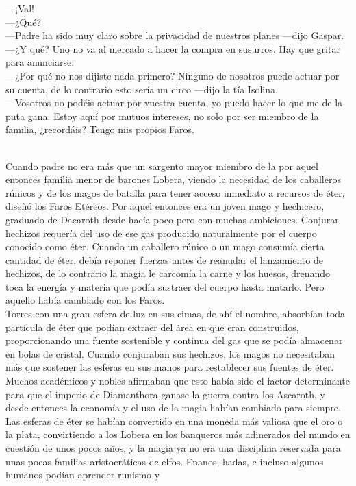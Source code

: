 \documentclass[
  letterpaper,
]{book}
\begin{document}
---¡Val!\\
---¿Qué?\\
---Padre ha sido muy claro sobre la privacidad de nuestros planes
---dijo Gaspar.\\
---¿Y qué? Uno no va al mercado a hacer la compra en susurros. Hay que
gritar para anunciarse.\\
---¿Por qué no nos dijiste nada primero? Ninguno de nosotros puede
actuar por su cuenta, de lo contrario esto sería un circo ---dijo la tía
Isolina.\\
---Vosotros no podéis actuar por vuestra cuenta, yo puedo hacer lo que
me de la puta gana. Estoy aquí por mutuos intereses, no solo por ser
miembro de la familia, ¿recordáis? Tengo mis propios Faros.\\
\strut \\
Cuando padre no era más que un sargento mayor miembro de la por aquel
entonces familia menor de barones Lobera, viendo la necesidad de los
caballeros rúnicos y de los magos de batalla para tener acceso inmediato
a recursos de éter, diseñó los Faros Etéreos. Por aquel entonces era un
joven mago y hechicero, graduado de Dacaroth desde hacía poco pero con
muchas ambiciones. Conjurar hechizos requería del uso de ese gas
producido naturalmente por el cuerpo conocido como éter. Cuando un
caballero rúnico o un mago consumía cierta cantidad de éter, debía
reponer fuerzas antes de reanudar el lanzamiento de hechizos, de lo
contrario la magia le carcomía la carne y los huesos, drenando toca la
energía y materia que podía sustraer del cuerpo hasta matarlo. Pero
aquello había cambiado con los Faros.\\
Torres con una gran esfera de luz en sus cimas, de ahí el nombre,
absorbían toda partícula de éter que podían extraer del área en que eran
construidos, proporcionando una fuente sostenible y continua del gas que
se podía almacenar en bolas de cristal. Cuando conjuraban sus hechizos,
los magos no necesitaban más que sostener las esferas en sus manos para
restablecer sus fuentes de éter. Muchos académicos y nobles afirmaban
que esto había sido el factor determinante para que el imperio de
Diamanthora ganase la guerra contra los Ascaroth, y desde entonces la
economía y el uso de la magia habían cambiado para siempre. Las esferas
de éter se habían convertido en una moneda más valiosa que el oro o la
plata, convirtiendo a los Lobera en los banqueros más adinerados del
mundo en cuestión de unos pocos años, y la magia ya no era una
disciplina reservada para unas pocas familias aristocráticas de elfos.
Enanos, hadas, e incluso algunos humanos podían aprender runismo y
\end{document}
